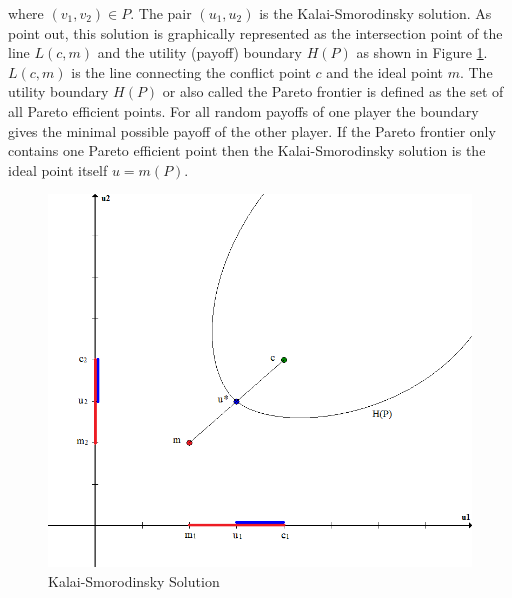 {where $(v_1,v_2) \in P$. The pair $(u_1,u_2)$ is the Kalai-Smorodinsky solution. As \citet{kalai1975other} point out, this solution is graphically represented as the intersection point of the line $L(c,m)$ and the utility (payoff) boundary $H(P)$ as shown in Figure \ref{fig:ksSol}. $L(c,m)$ is the line connecting the conflict point $c$ and the ideal point $m$. The utility boundary $H(P)$ or also called the Pareto frontier is defined as the set of all Pareto efficient points. For all random payoffs of one player the boundary gives the minimal possible payoff of the other player. If the Pareto frontier only contains one Pareto efficient point then the Kalai-Smorodinsky solution is the ideal point itself $u = m(P)$.

\begin{figure}[h]
\centering
\includegraphics[scale=0.5]{figures/kalaiSmorodinskySolution}
\caption{Kalai-Smorodinsky Solution}
\label{fig:ksSol}
\end{figure}

}
